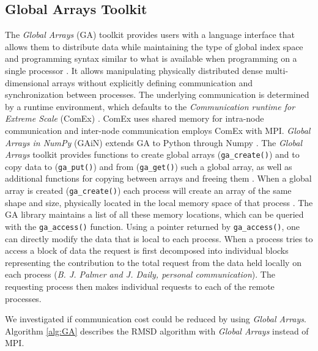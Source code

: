 \subsection{Global Arrays Toolkit}
\label{sec:methods-ga}

The \emph{Global Arrays} (GA) toolkit provides users with a language interface that allows them to distribute data while maintaining the type of global index space and programming syntax similar to what is available when programming on a single processor \cite{GA}.
It allows manipulating physically distributed dense multi-dimensional arrays without explicitly defining communication and synchronization between processes.
The underlying communication is determined by a runtime environment, which defaults to the \emph{Communication runtime for Extreme Scale} (ComEx) \cite{Daily:2014aa}.
ComEx uses shared memory for intra-node communication and inter-node communication employs ComEx with MPI.
\emph{Global Arrays in NumPy} (GAiN) extends GA to Python through Numpy \cite{GAiN}. 
The \emph{Global Arrays} toolkit provides functions to create global arrays (\texttt{ga\_create()}) and to copy data to (\texttt{ga\_put()}) and from (\texttt{ga\_get()}) such a global array,  as well as additional functions for copying between arrays and freeing them \cite{GAiN}.
When a global array is created (\texttt{ga\_create()}) each process will create an array of the same shape and size, physically located in the local memory space of that process \cite{GA}. 
The GA library maintains a list of all these memory locations, which can be queried with the \texttt{ga\_access()} function.
Using a pointer returned by \texttt{ga\_access()}, one can directly modify the data that is local to each process.
When a process tries to access a block of data the request is first decomposed into individual blocks representing the contribution to the total request from the data held locally on each process (\textit{B. J. Palmer and J. Daily, personal communication}).
The requesting process then makes individual requests to each of the remote processes. 

We investigated if communication cost could be reduced by using \emph{Global Arrays}.
Algorithm \ref{alg:GA} describes the RMSD algorithm with \emph{Global Arrays} instead of MPI.


